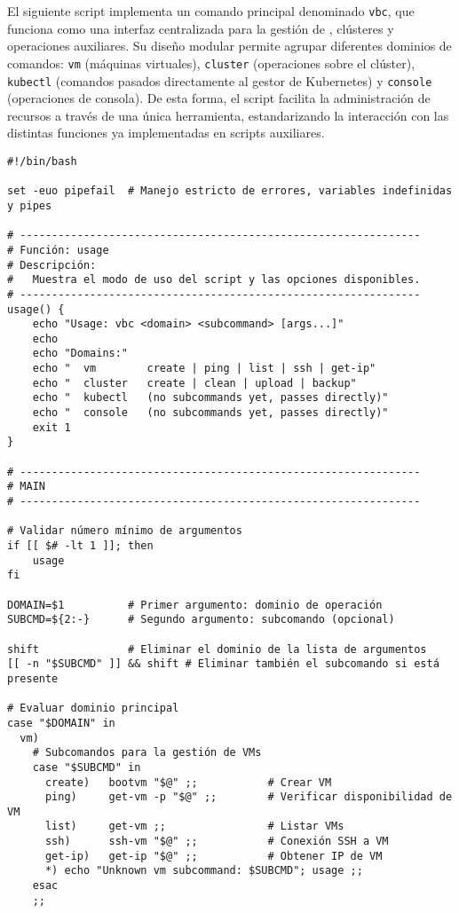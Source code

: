El siguiente script implementa un comando principal denominado \texttt{vbc}, que funciona como una interfaz centralizada para la gestión de \VM, clústeres y operaciones auxiliares. Su diseño modular permite agrupar diferentes dominios de comandos: \texttt{vm} (máquinas virtuales), \texttt{cluster} (operaciones sobre el clúster), \texttt{kubectl} (comandos pasados directamente al gestor de Kubernetes) y \texttt{console} (operaciones de consola). De esta forma, el script facilita la administración de recursos a través de una única herramienta, estandarizando la interacción con las distintas funciones ya implementadas en scripts auxiliares.

\begin{verbatim}
#!/bin/bash

set -euo pipefail  # Manejo estricto de errores, variables indefinidas y pipes

# ---------------------------------------------------------------
# Función: usage
# Descripción:
#   Muestra el modo de uso del script y las opciones disponibles.
# ---------------------------------------------------------------
usage() {
    echo "Usage: vbc <domain> <subcommand> [args...]"
    echo
    echo "Domains:"
    echo "  vm        create | ping | list | ssh | get-ip"
    echo "  cluster   create | clean | upload | backup"
    echo "  kubectl   (no subcommands yet, passes directly)"
    echo "  console   (no subcommands yet, passes directly)"
    exit 1
}

# ---------------------------------------------------------------
# MAIN
# ---------------------------------------------------------------

# Validar número mínimo de argumentos
if [[ $# -lt 1 ]]; then
    usage
fi

DOMAIN=$1          # Primer argumento: dominio de operación
SUBCMD=${2:-}      # Segundo argumento: subcomando (opcional)

shift              # Eliminar el dominio de la lista de argumentos
[[ -n "$SUBCMD" ]] && shift # Eliminar también el subcomando si está presente

# Evaluar dominio principal
case "$DOMAIN" in
  vm)
    # Subcomandos para la gestión de VMs
    case "$SUBCMD" in
      create)   bootvm "$@" ;;           # Crear VM
      ping)     get-vm -p "$@" ;;        # Verificar disponibilidad de VM
      list)     get-vm ;;                # Listar VMs
      ssh)      ssh-vm "$@" ;;           # Conexión SSH a VM
      get-ip)   get-ip "$@" ;;           # Obtener IP de VM
      *) echo "Unknown vm subcommand: $SUBCMD"; usage ;;
    esac
    ;;


\end{verbatim}
